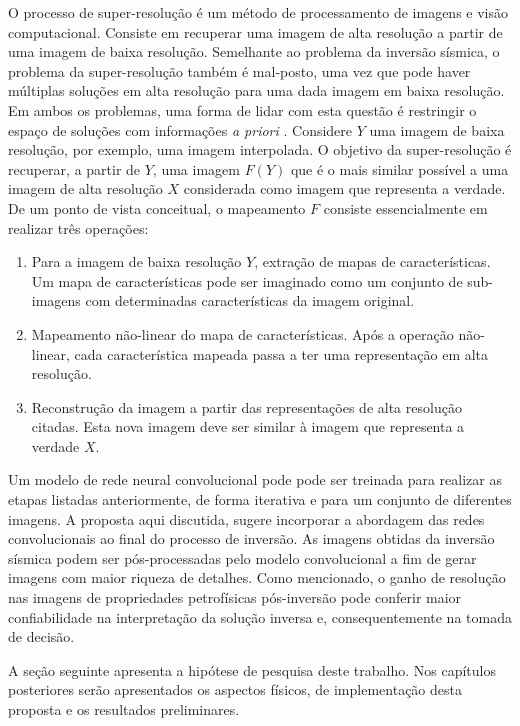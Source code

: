 O processo de super-resolução é um método de processamento de imagens e visão computacional.
Consiste em recuperar uma imagem de alta resolução a partir de uma imagem
de baixa resolução. Semelhante ao problema da inversão sísmica, o problema da super-resolução
também é mal-posto, uma vez que pode haver múltiplas soluções em alta resolução para uma dada imagem em baixa
resolução. Em ambos os problemas, uma forma de lidar com esta questão é restringir o espaço
de soluções com informações \textit{a priori} \citep{DongLoy14}. 
Considere $Y$ uma imagem de baixa resolução, por exemplo, uma
imagem interpolada. O objetivo da super-resolução é
recuperar, a partir de $Y$, uma imagem $F(Y)$ que é
o mais similar possível a uma imagem de alta resolução $X$
considerada como imagem que representa a verdade.
De um ponto de vista conceitual, o mapeamento $F$ consiste essencialmente em
realizar três operações:
\begin{enumerate}
 \item Para a imagem de baixa resolução $Y$, extração de mapas de características. Um mapa de características
 pode ser imaginado como um conjunto de sub-imagens com determinadas características da imagem original.
 \item Mapeamento não-linear do mapa de características. Após a operação não-linear, cada característica mapeada
 passa a ter uma representação em alta resolução.
 \item Reconstrução da imagem a partir das representações de alta resolução citadas. Esta nova imagem
 deve ser similar à imagem que representa a verdade $X$.
\end{enumerate}

Um modelo de rede neural convolucional pode pode ser treinada para realizar as etapas listadas anteriormente,
de forma iterativa e para um conjunto de diferentes imagens.
A proposta aqui discutida, sugere incorporar a abordagem das redes convolucionais ao final do processo de inversão.
As imagens obtidas da inversão sísmica podem ser pós-processadas pelo modelo convolucional
a fim de gerar imagens com maior riqueza de detalhes. Como mencionado, o ganho de resolução
nas imagens de propriedades petrofísicas pós-inversão pode conferir maior confiabilidade
na interpretação da solução inversa e, consequentemente na tomada de decisão.

A seção seguinte apresenta a hipótese de pesquisa deste trabalho. Nos capítulos posteriores
serão apresentados os aspectos físicos, de implementação desta proposta e os resultados preliminares.

